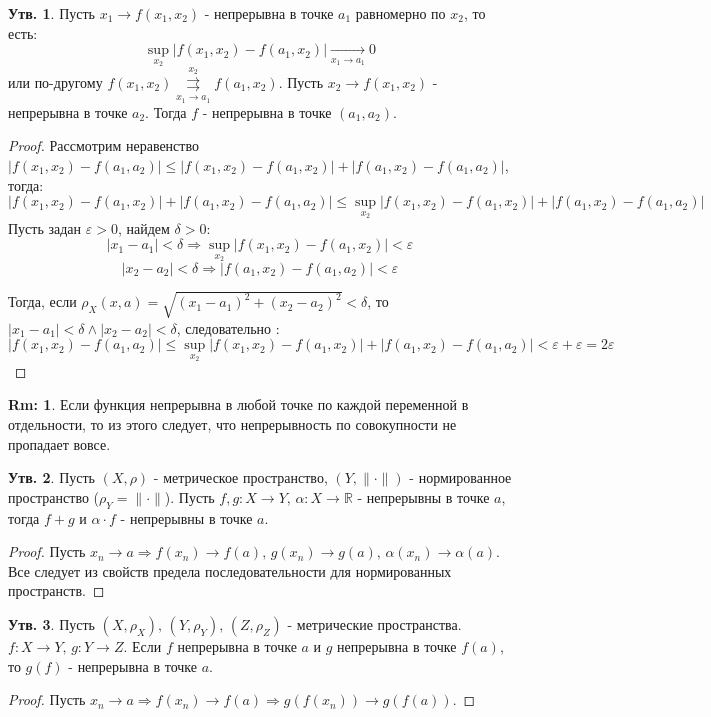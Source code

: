 \documentclass[12pt]{article}
\newcommand{\MR}{\mathbb{R}}
\newcommand{\VE}{\varepsilon}
\theoremstyle{definition}
\newtheorem{rem}{Rm:}
\newtheorem{prop}{Утв.}
\begin{document}
\begin{prop}
	Пусть $x_1 \to f(x_1,x_2)$ - непрерывна в точке $a_1$ равномерно по $x_2$, то есть:
	$$
		\sup\limits_{x_2}|f(x_1,x_2) - f(a_1,x_2)| \xrightarrow[x_1 \to a_1]{} 0
	$$
	или по-другому $f(x_1,x_2)\overset{x_2}{\underset{x_1 \to a_1}{\rightrightarrows}} f(a_1,x_2)$. Пусть $x_2 \to f(x_1,x_2)$ - непрерывна в точке $a_2$. Тогда $f$ - непрерывна в точке $(a_1,a_2)$. 
\end{prop}
\begin{proof}
	Рассмотрим неравенство $|f(x_1,x_2) - f(a_1,a_2)|\leq |f(x_1,x_2) - f(a_1, x_2)| + |f(a_1,x_2) - f(a_1,a_2)|$, тогда:
	$$
		|f(x_1,x_2) - f(a_1, x_2)| + |f(a_1,x_2) - f(a_1,a_2)| \leq \sup\limits_{x_2}|f(x_1,x_2) - f(a_1,x_2)| + |f(a_1,x_2) - f(a_1,a_2)|
	$$
	Пусть задан $\VE > 0$, найдем $\delta > 0$:
	$$
		|x_1 - a_1| < \delta \Rightarrow \sup\limits_{x_2}|f(x_1,x_2) - f(a_1,x_2)| < \VE
	$$
	$$
		|x_2 - a_2| < \delta \Rightarrow |f(a_1,x_2) - f(a_1,a_2)| < \VE
	$$ 
	
	Тогда, если $\rho_X(x,a) = \sqrt{(x_1 - a_1)^2 + (x_2 - a_2)^2} < \delta$, то $|x_1 - a_1| < \delta \wedge |x_2 - a_2| < \delta$, следовательно :
	$$
		|f(x_1,x_2) - f(a_1,a_2)| \leq \sup\limits_{x_2}|f(x_1,x_2) - f(a_1,x_2)| + |f(a_1,x_2) - f(a_1,a_2)| <  \VE + \VE = 2\VE
	$$
\end{proof}
\begin{rem}
	Если функция непрерывна в любой точке по каждой переменной в отдельности, то из этого следует, что непрерывность по совокупности не пропадает вовсе.
\end{rem}

\begin{prop}
	Пусть $(X,\rho)$ - метрическое пространство, $(Y,\| \cdot \|)$ - нормированное пространство ($\rho_Y = \| \cdot \|$). Пусть $f, g \colon X \to Y, \, \alpha \colon X \to \MR$ - непрерывны в точке $a$, тогда $f + g$ и $\alpha{\cdot}f$ - непрерывны в точке $a$.
\end{prop}
\begin{proof}
	Пусть $x_n \to a \Rightarrow f(x_n) \to f(a),\, g(x_n) \to g(a), \, \alpha(x_n) \to \alpha(a)$. Все следует из свойств предела последовательности для нормированных пространств.
\end{proof}

\begin{prop}
	Пусть $(X,\rho_X),\, (Y,\rho_Y), \, (Z,\rho_Z) $ - метрические пространства. $f\colon X \to Y, \, g \colon Y \to Z$. Если $f$ непрерывна в точке $a$ и $g$ непрерывна в точке $f(a)$, то $g(f)$ - непрерывна в точке $a$.
\end{prop}
\begin{proof}
	Пусть $x_n \to a \Rightarrow f(x_n) \to f(a)\Rightarrow g(f(x_n)) \to g(f(a))$.
\end{proof}
\end{document}
